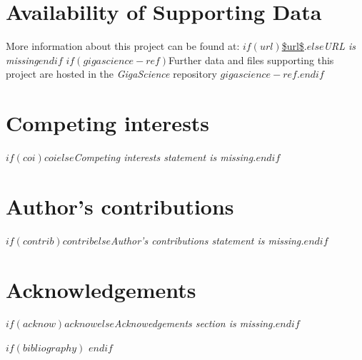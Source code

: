 \documentclass[twocolumn]{bmcart}%
\begin{document}
\begin{backmatter}

\section*{Availability of Supporting Data}
More information about this project can be found at: $if(url)$\url{$url$}.$else$\emph{URL is missing}$endif$ $if(gigascience-ref)$Further data and files supporting this project are hosted in the \emph{GigaScience} repository $gigascience-ref$.$endif$

\section*{Competing interests}
$if(coi)$$coi$$else$\emph{Competing interests statement is missing.}$endif$

\section*{Author's contributions}
$if(contrib)$$contrib$$else$\emph{Author's contributions statement is missing.}$endif$

\section*{Acknowledgements}
$if(acknow)$$acknow$$else$\emph{Acknowedgements section is missing.}$endif$

  
  

$if(bibliography)$
$endif$

\end{backmatter}
\end{document}
